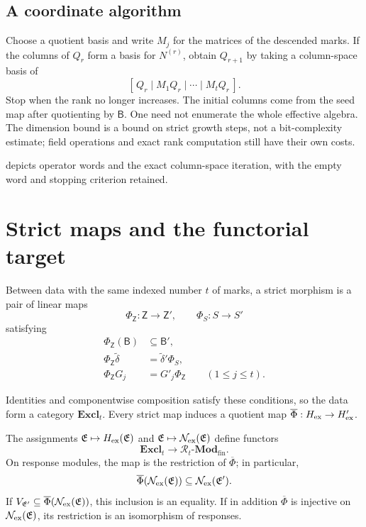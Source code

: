 \documentclass[11pt,a4paper]{article}
\begin{document}
\subsection{A coordinate algorithm}

Choose a quotient basis and write $M_j$ for the matrices of the descended
marks.  If the columns of $Q_r$ form a basis for $N^{(r)}$, obtain $Q_{r+1}$
by taking a column-space basis of
\[
 [\,Q_r\mid M_1Q_r\mid\cdots\mid M_tQ_r\,].
\]
Stop when the rank no longer increases.  The initial columns come from
the seed map after quotienting by $\mathsf B$.  One need not enumerate
the whole effective algebra.  The dimension bound is a bound on strict
growth steps, not a bit-complexity estimate; field operations and exact
rank computation still have their own costs.

 depicts operator words and the exact
column-space iteration, with the empty word and stopping criterion
retained.


\section{Strict maps and the functorial target}
\label{sec:functor}

\begin{definition}\label{def:strict}
Between data with the same indexed number $t$ of marks, a strict morphism
is a pair of linear maps
\[
 \Phi_{\mathsf Z}:\mathsf Z\to\mathsf Z',\qquad
 \Phi_S:S\to S'
\]
satisfying
\begin{align*}
 \Phi_{\mathsf Z}(\mathsf B)&\subseteq\mathsf B',\\
 \Phi_{\mathsf Z}\widetilde\delta&=\widetilde\delta'\Phi_S,\\
 \Phi_{\mathsf Z}G_j&=G'_j\Phi_{\mathsf Z}\qquad(1\leq j\leq t).
\end{align*}
\end{definition}

Identities and componentwise composition satisfy these conditions, so the
data form a category $\mathbf{Excl}_t$.  Every strict map induces a
quotient map $\overline\Phi:H_{\mathrm{ex}}\to H_{\mathrm{ex}}'$.

\begin{theorem}
\label{thm:functor}
The assignments $\mathfrak E\mapsto H_{\mathrm{ex}}(\mathfrak E)$ and
$\mathfrak E\mapsto\mathcal N_{\mathrm{ex}}(\mathfrak E)$ define functors
\[
 \mathbf{Excl}_t\longrightarrow\mathscr R_t\text{-}\mathbf{Mod}_{\mathrm{fin}}.
\]
On response modules, the map is the restriction of $\overline\Phi$;
in particular,
\[
 \overline\Phi(\mathcal N_{\mathrm{ex}}(\mathfrak E))\subseteq\mathcal N_{\mathrm{ex}}(\mathfrak E').
\]
If $V_{\mathfrak E'}\subseteq\overline\Phi(\mathcal N_{\mathrm{ex}}(\mathfrak E))$, this
inclusion is an equality.  If in addition $\overline\Phi$ is injective
on $\mathcal N_{\mathrm{ex}}(\mathfrak E)$, its restriction is an isomorphism of responses.
\end{theorem}
\end{document}

